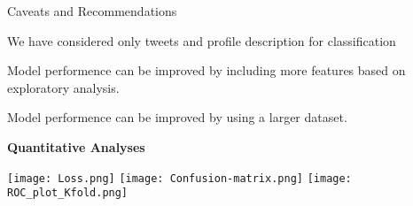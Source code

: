 \documentclass{article}
\begin{document}
\begin{adjustwidth}{-60pt}{-30pt}
\begin{singlespace}
\begin{tcolorbox}[title=\textbf{Model Card - Tweeter Gender Classification },
     breakable, sharp corners, boxrule=0.7pt]
{ \begin{mcsection}{Caveats and Recommendations}
     \item We have considered only tweets and profile description for classification
     \item Model performence can be improved by including more features based on exploratory analysis.
      \item Model performence can be improved by using a larger dataset.
 \end{mcsection}
 
 \textbf{Quantitative Analyses}
 
 \texttt{[image: Loss.png]} \texttt{[image: Confusion-matrix.png]}
 \texttt{[image: ROC\_plot\_Kfold.png]}

 
 } %
 \end{tcolorbox}
 \end{singlespace}
 \end{adjustwidth}
 
 
 
 
\end{document}
